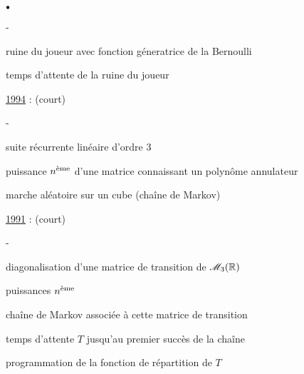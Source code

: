 \documentclass[11pt]{book}%
\begin{document}
\begin{noliste}{$\sbullet$}
\begin{noliste}{-}
  \item ruine du joueur avec fonction géneratrice de la Bernoulli
  
  \item temps d'attente de la ruine du joueur
 \end{noliste}
 
\item \underline{1994} : (court)
 \begin{noliste}{-}
  \item suite récurrente linéaire d'ordre $3$
  
  \item puissance $\eme{n}$ d'une matrice connaissant un polynôme 
  annulateur
  
  \item marche aléatoire sur un cube (chaîne de Markov)
 \end{noliste}
 
\item \underline{1991} : (court)
 \begin{noliste}{-}
  \item diagonalisation d'une matrice de transition de $\M{3}$
  
  \item puissances $\eme{n}$
  
  \item chaîne de Markov associée à cette matrice de transition
  
  \item temps d'attente $T$ jusqu'au premier succès de la chaîne
  
  \item programmation de la fonction de répartition de $T$
 \end{noliste}
\end{noliste}
\end{document}
